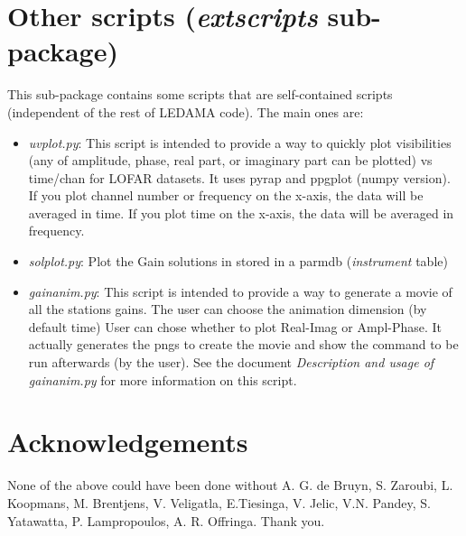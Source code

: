 \documentclass[a4paper,11pt]{article}
\begin{document}
\section{Other scripts (\textit{extscripts} sub-package)}

This sub-package contains some scripts that are self-contained scripts (independent of the rest of LEDAMA code). The main ones are:

\begin{itemize}
	\item \textit{uvplot.py}: This script is intended to provide a way to quickly plot visibilities (any of amplitude, phase, real part, or imaginary part can be plotted) vs time/chan for LOFAR datasets. It uses pyrap and ppgplot (numpy version).
If you plot channel number or frequency on the x-axis, the data will be averaged in time. If you plot time on the x-axis, the data will be averaged in frequency.
	\item \textit{solplot.py}: Plot the Gain solutions in stored in a parmdb (\textit{instrument} table)
	\item \textit{gainanim.py}: This script is intended to provide a way to generate a movie of all the stations gains. The user can choose the animation dimension (by default time) User can chose whether to plot Real-Imag or Ampl-Phase. It actually generates the pngs to create the movie and show the command to be run afterwards (by the user). 
See the document \textit{Description and usage of gainanim.py} for more information on this script.

\end{itemize}

\section*{Acknowledgements}

None of the above could have been done without A. G. de Bruyn, S. Zaroubi, L. Koopmans, M. Brentjens, V. Veligatla, E.Tiesinga, V. Jelic, V.N. Pandey, S. Yatawatta, P. Lampropoulos, A. R. Offringa. Thank you.
\end{document}
